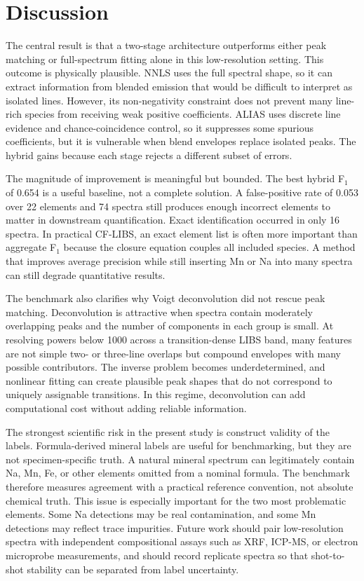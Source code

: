 \documentclass[preprint,12pt,authoryear]{elsarticle}
\begin{document}
\section{Discussion}

The central result is that a two-stage architecture outperforms either peak matching or full-spectrum fitting alone in this low-resolution setting. This outcome is physically plausible. NNLS uses the full spectral shape, so it can extract information from blended emission that would be difficult to interpret as isolated lines. However, its non-negativity constraint does not prevent many line-rich species from receiving weak positive coefficients. ALIAS uses discrete line evidence and chance-coincidence control, so it suppresses some spurious coefficients, but it is vulnerable when blend envelopes replace isolated peaks. The hybrid gains because each stage rejects a different subset of errors.

The magnitude of improvement is meaningful but bounded. The best hybrid F$_1$ of 0.654 is a useful baseline, not a complete solution. A false-positive rate of 0.053 over 22 elements and 74 spectra still produces enough incorrect elements to matter in downstream quantification. Exact identification occurred in only 16 spectra. In practical CF-LIBS, an exact element list is often more important than aggregate F$_1$ because the closure equation couples all included species. A method that improves average precision while still inserting Mn or Na into many spectra can still degrade quantitative results.

The benchmark also clarifies why Voigt deconvolution did not rescue peak matching. Deconvolution is attractive when spectra contain moderately overlapping peaks and the number of components in each group is small. At resolving powers below 1000 across a transition-dense LIBS band, many features are not simple two- or three-line overlaps but compound envelopes with many possible contributors. The inverse problem becomes underdetermined, and nonlinear fitting can create plausible peak shapes that do not correspond to uniquely assignable transitions. In this regime, deconvolution can add computational cost without adding reliable information.

The strongest scientific risk in the present study is construct validity of the labels. Formula-derived mineral labels are useful for benchmarking, but they are not specimen-specific truth. A natural mineral spectrum can legitimately contain Na, Mn, Fe, or other elements omitted from a nominal formula. The benchmark therefore measures agreement with a practical reference convention, not absolute chemical truth. This issue is especially important for the two most problematic elements. Some Na detections may be real contamination, and some Mn detections may reflect trace impurities. Future work should pair low-resolution spectra with independent compositional assays such as XRF, ICP-MS, or electron microprobe measurements, and should record replicate spectra so that shot-to-shot stability can be separated from label uncertainty.
\end{document}
